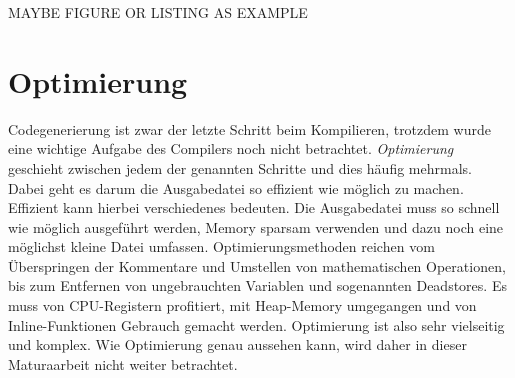 MAYBE FIGURE OR LISTING AS EXAMPLE

\section{Optimierung}
Codegenerierung ist zwar der letzte Schritt beim Kompilieren, trotzdem wurde eine wichtige Aufgabe des Compilers noch nicht betrachtet. \textit{Optimierung} geschieht zwischen jedem der genannten Schritte und dies häufig mehrmals.
Dabei geht es darum die Ausgabedatei so effizient wie möglich zu machen. Effizient kann hierbei verschiedenes bedeuten.
Die Ausgabedatei muss so schnell wie möglich ausgeführt werden, Memory sparsam verwenden und dazu noch eine möglichst kleine Datei umfassen. 
Optimierungsmethoden reichen vom Überspringen der Kommentare und Umstellen von mathematischen Operationen, bis zum Entfernen von ungebrauchten Variablen und sogenannten Deadstores.
Es muss von CPU-Registern profitiert, mit Heap-Memory umgegangen und von Inline-Funktionen Gebrauch gemacht werden. Optimierung ist also sehr vielseitig und komplex.
Wie Optimierung genau aussehen kann, wird daher in dieser Maturaarbeit nicht weiter betrachtet.
